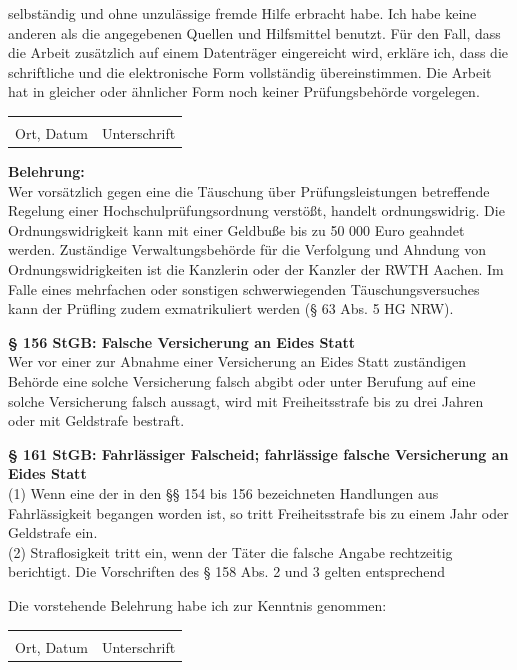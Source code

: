 \documentclass[12pt, a4paper, oneside]{article}
\begin{document}
	selbständig und ohne unzulässige fremde Hilfe erbracht habe. Ich habe keine anderen als die angegebenen Quellen und Hilfsmittel benutzt. Für den Fall, dass die Arbeit zusätzlich auf einem Datenträger eingereicht wird, erkläre ich, dass die schriftliche und die elektronische Form vollständig übereinstimmen. Die Arbeit hat in gleicher oder ähnlicher Form noch keiner Prüfungsbehörde vorgelegen.
	
	\vspace{0.6cm}
	
	\begin{tabular}{@{}p{8cm}p{5.8cm}}
		\underline{\smash{Aachen, den \today}} & \underline{\hspace{5.8cm}}\\
		Ort, Datum & Unterschrift \\
	\end{tabular}
	
	\vspace{0.6cm}

	\begin{small}
		\textbf{Belehrung:}\\
		Wer vorsätzlich gegen eine die Täuschung über Prüfungsleistungen betreffende Regelung einer Hochschulprüfungsordnung verstößt, handelt ordnungswidrig. Die Ordnungswidrigkeit kann mit einer Geldbuße bis zu 50 000 Euro geahndet werden. Zuständige Verwaltungsbehörde für die Verfolgung und Ahndung von Ordnungswidrigkeiten ist die Kanzlerin oder der Kanzler der RWTH Aachen. Im Falle eines mehrfachen oder sonstigen schwerwiegenden Täuschungsversuches kann der Prüfling zudem exmatrikuliert werden (§ 63 Abs. 5 HG NRW).
		
		\textbf{§ 156 StGB: Falsche Versicherung an Eides Statt}\\
		Wer vor einer zur Abnahme einer Versicherung an Eides Statt zuständigen Behörde eine solche Versicherung falsch abgibt oder unter Berufung auf eine solche Versicherung falsch aussagt, wird mit Freiheitsstrafe bis zu drei Jahren oder mit Geldstrafe bestraft.
		
		\textbf{§ 161 StGB: Fahrlässiger Falscheid; fahrlässige falsche Versicherung an Eides Statt}\\
		(1) Wenn eine der in den §§ 154 bis 156 bezeichneten Handlungen aus Fahrlässigkeit begangen worden ist, so tritt Freiheitsstrafe bis zu einem Jahr oder Geldstrafe ein.\\
		(2) Straflosigkeit tritt ein, wenn der Täter die falsche Angabe rechtzeitig berichtigt. Die Vorschriften des § 158 Abs. 2 und 3 gelten entsprechend
	\end{small}

	\vspace{0.6cm}
	
	Die vorstehende Belehrung habe ich zur Kenntnis genommen:
	
	\vspace{0.6cm}
	
	\begin{tabular}{@{}p{8cm}p{5.8cm}}
		\underline{\smash{Aachen, den \today}} & \underline{\hspace{5.8cm}}\\
		Ort, Datum & Unterschrift \\
	\end{tabular}
	
	\endgroup
	\clearpage
	
\end{document}
